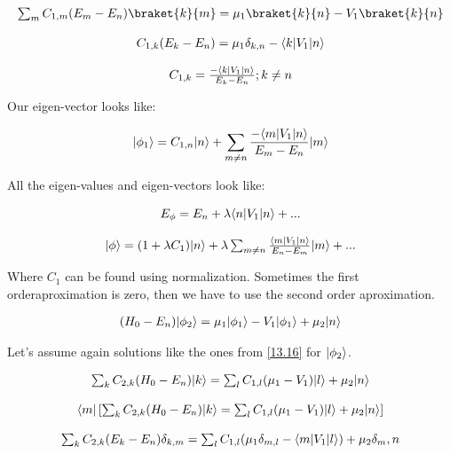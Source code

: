 \begin{equation}
  \begin{array}{c}
    \sum_{m} C_{1,m} (E_m-E_n) \braket{k}{m} = \mu_1 \braket{k}{n} - V_1 \braket{k}{n}
    \\

    \\
    C_{1,k} (E_k - E_n) = \mu_1 \delta_{k,n} - \bra{k}V_1\ket{n}
    \\

    \\
    C_{1,k} = \frac{-\bra{k}V_1\ket{n}}{E_k-E_n} ; k \neq n
  \end{array}
\end{equation}

Our eigen-vector looks like:

\begin{equation}
  \lvert\phi_1\rangle = C_{1,n}\lvert n\rangle + \sum_{m \neq n} \frac{-\langle m\rvert V_1\lvert n\rangle}{E_m - E_n} \lvert m\rangle
\end{equation}

All the eigen-values and eigen-vectors look like:

\begin{equation}
  \begin{array}{c}
  E_{\phi} = E_n + \lambda\langle n\rvert V_1\lvert n\rangle + ...
  \\

  \\
  \lvert\phi\rangle = (1+\lambda C_1) \lvert n\rangle + \lambda \sum_{m \neq n} \frac{\langle m\rvert V_1\lvert n\rangle}{E_n - E_m}\lvert m\rangle + ...
  \end{array}
\end{equation}

Where $C_1$ can be found using normalization. Sometimes the first orderaproximation is zero, then we have to use the second order aproximation.

\begin{equation}
  \begin{array}{c}
    (H_0 - E_n) \lvert\phi_2\rangle = \mu_1 \lvert\phi_1\rangle - V_1 \lvert\phi_1\rangle + \mu_2 \lvert n\rangle
  \end{array}
\end{equation}

Let's assume again solutions like the ones from \ref{13.16} for $\lvert\phi_2\rangle$.

\begin{equation}
\begin{array}{c}
  \sum_{k} C_{2,k}(H_0-E_n)\lvert k\rangle = \sum_{l} C_{1,l} (\mu_1 - V_1)\lvert l\rangle + \mu_2 \lvert n\rangle
  \\

  \\
  \langle m\rvert \left[\sum_{k} C_{2,k}(H_0-E_n)\lvert k\rangle = \sum_{l} C_{1,l} (\mu_1 - V_1)\lvert l\rangle + \mu_2 \lvert n\rangle\right]
  \\

  \\
  \sum_k C_{2,k}(E_k -E_n)\delta_{k,m} = \sum_l C_{1,l} (\mu_1 \delta_{m,l} - \langle m\rvert V_1\lvert l\rangle) + \mu_2 \delta_m,n
\end{array}
\end{equation}

